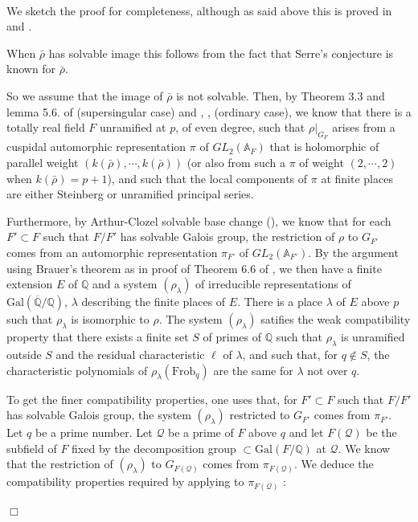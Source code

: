 \documentclass[12pt]{article}
\newcommand{\A}{\mathbb{A}}
\newcommand{\Q}{\mathbb{Q}}
\newcommand{\aQ}{\overline{\mathbb{Q}}}
\newcommand{\rhobar}{\overline{\rho}}
\newenvironment{proof}{\smallskip\noindent{\bf Proof.}\
}{$\Box$\smallskip\goodbreak}
\def\rhobar{ {\bar {\rho} } }
\def\rhob{ {\bar {\rho} } }
\begin{document}
\begin{proof}

We sketch the proof for completeness, although as said above this is
proved in \cite{D} and \cite{Wint}.

When $\rhobar$ has
solvable image this follows from the fact that Serre's conjecture is
known for $\rhobar$.

So we assume that the image of $\rhob$ is not solvable.
Then, by Theorem 3.3 and lemma 5.6. of \cite{[T03]} (supersingular case) and
\cite{[T02]}, \cite{Fujiwara}, \cite{SW3} (ordinary case),  we know that
there is a totally real field $F$ unramified at $p$, of even degree,
such that $\rho|_{G_F}$
arises
from a cuspidal automorphic representation $\pi$ of $GL_2(\A_F)$
that is holomorphic of parallel weight
$(k(\rhobar),\cdots,k(\rhobar))$ (or also from such a $\pi$ of weight
$(2,\cdots,2)$ when $k(\rhob)=p+1$), and such that the local components of
$\pi$ at finite
places are either Steinberg or unramified principal series.

Furthermore, by Arthur-Clozel solvable base change (\cite{AC}),
we know that for each $F'\subset F$ such that $F/ F'$ has solvable
Galois group, the restriction of $\rho$ to $G_{F'}$ comes
from an automorphic representation $\pi _{F'}$ of $GL_2(\A_{F'})$.
By the argument using Brauer's theorem as in proof of Theorem 6.6 of
\cite{[T03]},
we then have a finite extension $E$ of $\Q$ and a system
$(\rho _{\lambda})$ of irreducible representations of
$\mathrm{Gal}(\aQ / \Q)$,
$\lambda$ describing the finite places of $E$.
There is a place $\lambda$ of $E$ above $p$ such that $\rho_{\lambda }$
is isomorphic to $\rho$.
The system
$(\rho _{\lambda})$  satifies
the weak compatibility property that there exists a finite
set $S$  of primes of $\Q$
such that $\rho_{\lambda}$ is unramified
outside $S$ and the residual characteristic $\ell$ of
$\lambda$, and such that, for $q\notin S$, the characteristic polynomials
of $\rho_{\lambda}(\mathrm{Frob}_{q})$ are the same for
$\lambda$ not over $q$.

To get the finer compatibility properties, one uses that, for
$F'\subset F$ such that $F/ F'$ has solvable Galois group,
the system $(\rho _{\lambda})$ restricted to $G_{F'}$ comes from $\pi_{F'}$. Let
$q$ be a prime number. Let $\mathcal{Q}$ be a prime of $F$
above $q$ and let $F(\mathcal{Q})$ be the subfield
of $F$ fixed by the decomposition group
$\subset \mathrm{Gal}(F/\Q )$ at $\mathcal{Q}$.
We know that the restriction of $(\rho_{\lambda})$
to $G_{ F(\mathcal{Q})}$ comes from $\pi_ { F(\mathcal{Q})}$.
We deduce the compatibility properties required by applying
to $\pi_ { F(\mathcal{Q})}$ :


\end{proof}
\end{document}
